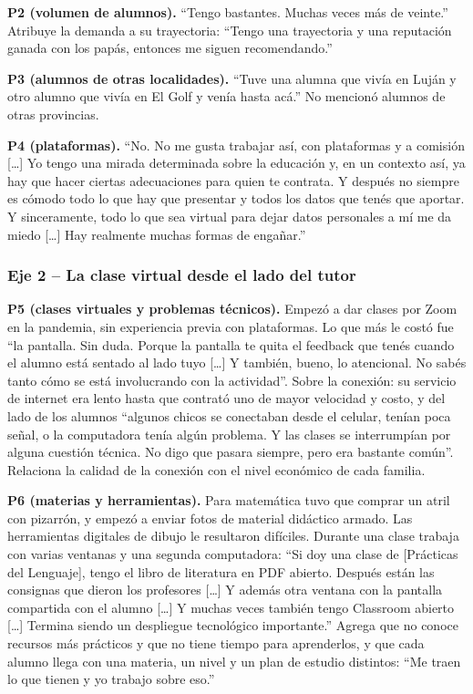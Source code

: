 \textbf{P2 (volumen de alumnos).} ``Tengo bastantes. Muchas veces más de
veinte.'' Atribuye la demanda a su trayectoria: ``Tengo una trayectoria
y una reputación ganada con los papás, entonces me siguen
recomendando.''

\textbf{P3 (alumnos de otras localidades).} ``Tuve una alumna que vivía
en Luján y otro alumno que vivía en El Golf y venía hasta acá.'' No
mencionó alumnos de otras provincias.

\textbf{P4 (plataformas).} ``No. No me gusta trabajar así, con
plataformas y a comisión [\ldots] Yo tengo una mirada determinada sobre
la educación y, en un contexto así, ya hay que hacer ciertas
adecuaciones para quien te contrata. Y después no siempre es cómodo todo
lo que hay que presentar y todos los datos que tenés que aportar. Y
sinceramente, todo lo que sea virtual para dejar datos personales a mí
me da miedo [\ldots] Hay realmente muchas formas de engañar.''

\subsubsection*{Eje 2 -- La clase virtual desde el lado del tutor}

\textbf{P5 (clases virtuales y problemas técnicos).} Empezó a dar clases
por Zoom en la pandemia, sin experiencia previa con plataformas. Lo que
más le costó fue ``la pantalla. Sin duda. Porque la pantalla te quita el
feedback que tenés cuando el alumno está sentado al lado tuyo [\ldots] Y
también, bueno, lo atencional. No sabés tanto cómo se está involucrando
con la actividad''. Sobre la conexión: su servicio de internet era lento
hasta que contrató uno de mayor velocidad y costo, y del lado de los
alumnos ``algunos chicos se conectaban desde el celular, tenían poca
señal, o la computadora tenía algún problema. Y las clases se
interrumpían por alguna cuestión técnica. No digo que pasara siempre,
pero era bastante común''. Relaciona la calidad de la conexión con el
nivel económico de cada familia.

\textbf{P6 (materias y herramientas).} Para matemática tuvo que comprar
un atril con pizarrón, y empezó a enviar fotos de material didáctico
armado. Las herramientas digitales de dibujo le resultaron difíciles.
Durante una clase trabaja con varias ventanas y una segunda computadora:
``Si doy una clase de [Prácticas del Lenguaje], tengo el libro de
literatura en PDF abierto. Después están las consignas que dieron los
profesores [\ldots] Y además otra ventana con la pantalla compartida con
el alumno [\ldots] Y muchas veces también tengo Classroom abierto
[\ldots] Termina siendo un despliegue tecnológico importante.'' Agrega
que no conoce recursos más prácticos y que no tiene tiempo para
aprenderlos, y que cada alumno llega con una materia, un nivel y un plan
de estudio distintos: ``Me traen lo que tienen y yo trabajo sobre
eso.''

